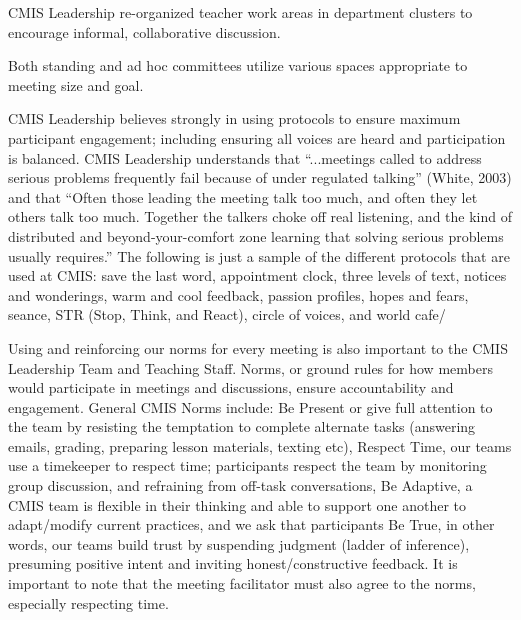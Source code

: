 \documentclass{report}
\begin{document}
\begin{findings}

CMIS Leadership re-organized teacher work areas in department clusters to encourage informal, collaborative  discussion. 

Both standing and ad hoc committees utilize various spaces appropriate to meeting size and goal.

 
CMIS Leadership believes strongly in using protocols to ensure maximum participant engagement; including ensuring all voices are heard and participation is balanced. CMIS Leadership understands that “...meetings called to address serious problems frequently fail because of under regulated talking” (White, 2003)  and that “Often those leading the meeting talk too much, and often they let others talk too much. Together the talkers choke off real listening, and the kind of distributed and beyond-your-comfort zone learning that solving serious problems usually requires.” The following is just a sample of the different protocols that are used at CMIS: save the last word, appointment clock, three levels of text, notices and wonderings, warm and cool feedback, passion profiles, hopes and fears, seance, STR (Stop, Think, and React), circle of voices, and world cafe/   

Using and reinforcing our norms for every meeting is also important to the CMIS Leadership Team and Teaching Staff. Norms, or ground rules for how members would participate in meetings and discussions, ensure accountability and engagement. General CMIS Norms include: Be Present or give full attention to  the team by resisting the temptation to complete alternate tasks (answering emails, grading, preparing lesson materials, texting etc), Respect Time, our teams use a timekeeper to respect time; participants respect the team by monitoring group discussion, and refraining from off-task conversations, Be Adaptive, a CMIS team is flexible in their thinking and able to support one another to adapt/modify current practices, and we ask that participants Be True, in other words, our teams build trust by suspending judgment (ladder of inference), presuming positive intent and inviting  honest/constructive feedback. It is important to note that the meeting facilitator must also agree to the norms, especially respecting time. 


\end{findings}
\end{document}

